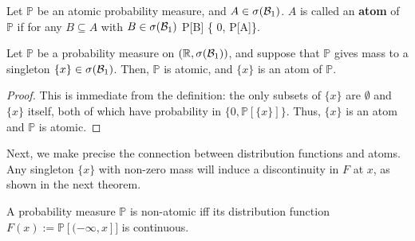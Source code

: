 \begin{definition}[Atom]
	Let $\mathbb P$ be an atomic probability measure, and $A\in\sigma(\mathcal{B}_{1})$. $A$ is called an \textbf{atom} of $\mathbb P$ if for any $B\subseteq A$ with $B\in\sigma(\mathcal{B}_{1})$
	\eq
		\mathbb P[B] \in \{ 0, \mathbb P[A]\}.
	\qe
\end{definition}

\begin{prop}
	Let $\mathbb P$ be a probability measure on $(\mathbb R, \sigma(\mathcal{B}_{1}))$, and suppose that $\mathbb P$ gives mass to a singleton $\{x\}\in\sigma(\mathcal{B}_{1})$. Then, $\mathbb P$ is atomic, and $\{x\}$ is an atom of $\mathbb P$. 
\end{prop}
\begin{proof}
	This is immediate from the definition: the only subsets of $\{x\}$ are $\emptyset$ and $\{x\}$ itself, both of which have probability in $\{0, \mathbb P[\{x\}]\}$. Thus, $\{x\}$ is an atom and $\mathbb P$ is atomic. 
\end{proof}
Next, we make precise the connection between distribution functions and atoms. Any singleton $\{x\}$ with non-zero mass will induce a discontinuity in $F$ at $x$, as shown in the next theorem. 
\begin{theorem}
	A probability measure $\mathbb P$ is non-atomic iff its distribution function $F(x) := \mathbb P[(-\infty, x]]$ is continuous. 
\end{theorem}
